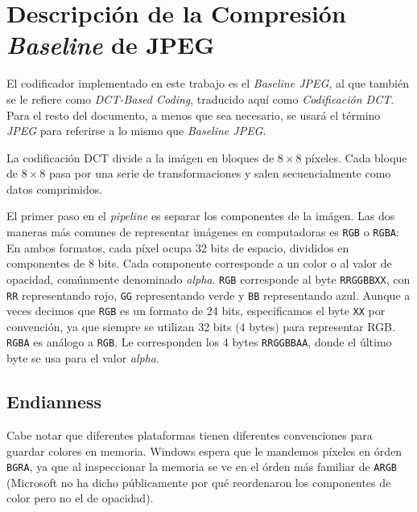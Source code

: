 \section{Descripción de la Compresión \emph{Baseline} de JPEG}

El codificador implementado en este trabajo es el \emph{Baseline JPEG}, al que
también se le refiere como \emph{DCT-Based Coding}, traducido aquí como
\emph{Codificación DCT}. Para el resto del documento, a menos que sea
necesario, se usará el término \emph{JPEG} para referirse a lo mismo que
\emph{Baseline JPEG}.

La codificación DCT divide a la imágen en bloques de $8\times8$ píxeles. Cada
bloque de $8\times8$ pasa por una serie de transformaciones y salen
secuencialmente como datos comprimidos.

El primer paso en el \emph{pipeline} es separar los componentes de la imágen.
Las dos maneras más comunes de representar imágenes en computadoras es
\verb+RGB+ o \verb+RGBA+: En ambos formatos, cada píxel ocupa 32 bits de
espacio, divididos en componentes de 8 bits. Cada componente corresponde a un
color o al valor de opacidad, comúnmente denominado \emph{alpha}. \verb+RGB+
corresponde al byte \verb+RRGGBBXX+, con \verb+RR+ representando rojo,
\verb+GG+ representando verde y \verb+BB+ representando azul. Aunque a veces
decimos que \verb+RGB+ es un formato de 24 bits, especificamos el byte
\verb+XX+ por convención, ya que siempre se utilizan 32 bits (4 bytes) para
representar RGB. \verb+RGBA+ es análogo a \verb+RGB+. Le corresponden los 4
bytes \verb+RRGGBBAA+, donde el último byte se usa para el valor \emph{alpha}.

\subsection{Endianness}


Cabe notar que diferentes plataformas tienen diferentes convenciones para
guardar colores en memoria. Windows espera que le mandemos píxeles en órden
\verb+BGRA+, ya que al inspeccionar la memoria se ve en el órden más familiar
de \verb+ARGB+ (Microsoft no ha dicho públicamente por qué reordenaron los
componentes de color pero no el de opacidad).


